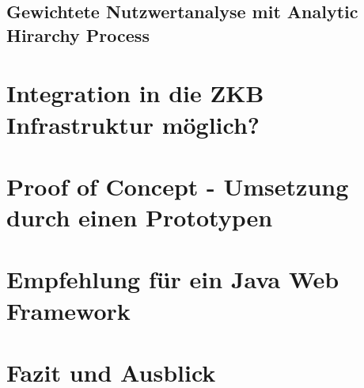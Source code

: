 \documentclass[
11pt, %
a4paper, %
BCOR25mm, %
DIV14, %
footsepline = false, %
headsepline, %
twoside, %
openright,
abstracton, %
listof=totocnumbered, %
bibliography=totocnumbered %
]{scrreprt}
\begin{document}
  \section{Gewichtete Nutzwertanalyse mit Analytic Hirarchy Process}
  
  \cleardoublepage
  
   
  \chapter{Integration in die ZKB Infrastruktur möglich?}

  \cleardoublepage
  
  
  \chapter{Proof of Concept - Umsetzung durch einen Prototypen}

  \cleardoublepage  
  
   
  \chapter{Empfehlung für ein Java Web Framework}

  \cleardoublepage
  
   
  \chapter{Fazit und Ausblick} 

  \cleardoublepage
  
  
\end{document}
